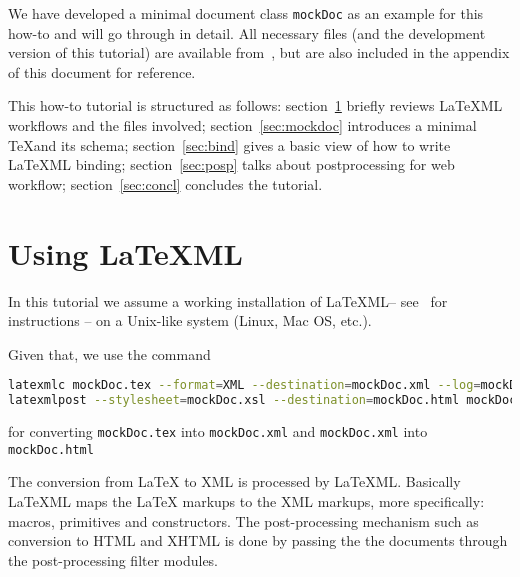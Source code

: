 \documentclass[a4paper]{article}
\def\latexml{{\LaTeX}ML\xspace}
\begin{document}
We have developed a minimal document class \lstinline|mockDoc| as an example for this
how-to and will go through in detail. All necessary files (and the development
version of this tutorial) are available from~\cite{mockDoc:git}, but are also included in
the appendix of this document for reference.

This how-to tutorial is structured as follows: section~\ref{sec:using} briefly reviews
\latexml workflows and the files involved; section~\ref{sec:mockdoc} introduces a minimal \TeX and its 
schema; section~\ref{sec:bind} gives a basic view of how to write \latexml binding; section~\ref{sec:posp} talks about postprocessing for web workflow; section~\ref{sec:concl} concludes the tutorial.


\section{Using LaTeXML}\label{sec:using}

In this tutorial we assume a working installation of \latexml -- see~\cite{LaTeXML:get}
for instructions -- on a Unix-like system (Linux, Mac OS, etc.). 

 Given that, we use the
command
\begin{lstlisting}[language=bash]
latexmlc mockDoc.tex --format=XML --destination=mockDoc.xml --log=mockDoc.xml.log 
latexmlpost --stylesheet=mockDoc.xsl --destination=mockDoc.html mockDoc.xml
\end{lstlisting}
for converting \lstinline|mockDoc.tex| into \lstinline|mockDoc.xml| and \lstinline|mockDoc.xml| into
\lstinline|mockDoc.html|


The conversion from {\LaTeX} to XML is processed by \latexml. Basically \latexml maps the
{\LaTeX} markups to the XML markups, more specifically: macros, primitives and
constructors. The post-processing mechanism such as conversion to HTML and XHTML is done by 
passing the the documents through the post-processing filter modules.
\end{document}
